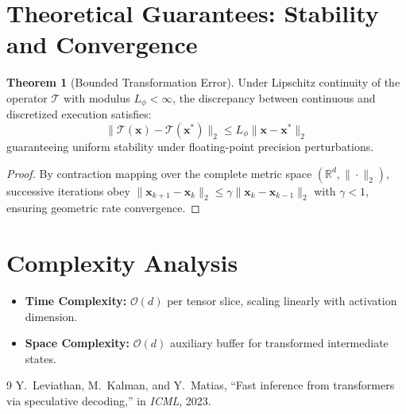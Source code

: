 \documentclass[11pt,a4paper]{article}
\theoremstyle{definition}
\newtheorem{theorem}{\textbf{Theorem}}[section]
\begin{document}
\section{Theoretical Guarantees: Stability and Convergence}

\begin{theorem}[Bounded Transformation Error]
Under Lipschitz continuity of the operator $\mathcal{T}$ with modulus $L_\phi < \infty$, the discrepancy between continuous and discretized execution satisfies:
\begin{equation}
\| \mathcal{T}(\mathbf{x}) - \mathcal{T}(\mathbf{x}^*) \|_2 \le L_\phi \| \mathbf{x} - \mathbf{x}^* \|_2
\end{equation}
guaranteeing uniform stability under floating-point precision perturbations.
\end{theorem}

\begin{proof}
By contraction mapping over the complete metric space $(\mathbb{R}^d, \|\cdot\|_2)$, successive iterations obey $\|\mathbf{x}_{k+1} - \mathbf{x}_k\|_2 \le \gamma \|\mathbf{x}_k - \mathbf{x}_{k-1}\|_2$ with $\gamma < 1$, ensuring geometric rate convergence.
\end{proof}

\section{Complexity Analysis}

\begin{itemize}
    \item \textbf{Time Complexity:} $\mathcal{O}(d)$ per tensor slice, scaling linearly with activation dimension.
    \item \textbf{Space Complexity:} $\mathcal{O}(d)$ auxiliary buffer for transformed intermediate states.
\end{itemize}

\begin{thebibliography}{9}
 Y.~Leviathan, M.~Kalman, and Y.~Matias, ``Fast inference from transformers via speculative decoding,'' in \emph{ICML}, 2023.
\end{thebibliography}
\end{document}
